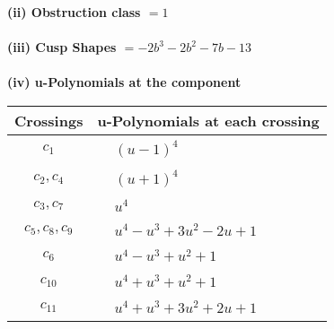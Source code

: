 \documentclass[1p]{elsarticle_modified}
\theoremstyle{definition}
\begin{document}
\flushleft \textbf{(ii) Obstruction class $= 1$}\\~\\
\flushleft \textbf{(iii) Cusp Shapes $= -2 b^3-2 b^2-7 b-13$}\\~\\
\newpage\renewcommand{\arraystretch}{1}
\flushleft \textbf{(iv) u-Polynomials at the component}\newline \\
\begin{tabular}{m{50pt}|m{274pt}}
Crossings & \hspace{64pt}u-Polynomials at each crossing \\
\hline $$\begin{aligned}c_{1}\end{aligned}$$&$\begin{aligned}
&(u-1)^4
\end{aligned}$\\
\hline $$\begin{aligned}c_{2},c_{4}\end{aligned}$$&$\begin{aligned}
&(u+1)^4
\end{aligned}$\\
\hline $$\begin{aligned}c_{3},c_{7}\end{aligned}$$&$\begin{aligned}
&u^4
\end{aligned}$\\
\hline $$\begin{aligned}c_{5},c_{8},c_{9}\end{aligned}$$&$\begin{aligned}
&u^4- u^3+3 u^2-2 u+1
\end{aligned}$\\
\hline $$\begin{aligned}c_{6}\end{aligned}$$&$\begin{aligned}
&u^4- u^3+u^2+1
\end{aligned}$\\
\hline $$\begin{aligned}c_{10}\end{aligned}$$&$\begin{aligned}
&u^4+u^3+u^2+1
\end{aligned}$\\
\hline $$\begin{aligned}c_{11}\end{aligned}$$&$\begin{aligned}
&u^4+u^3+3 u^2+2 u+1
\end{aligned}$\\
\hline
\end{tabular}\\~\\
\end{document}
